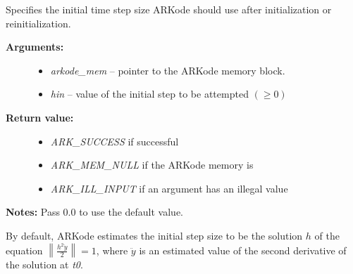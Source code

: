 \documentclass[letterpaper,10pt,english]{sphinxmanual}
\begin{document}
\begin{fulllineitems}
\label{c_interface/User_callable:c.ARKodeSetInitStep}
Specifies the initial time step size ARKode should use after
initialization or reinitialization.
\begin{description}
\item[{\textbf{Arguments:}}] \leavevmode\begin{itemize}
\item {} 
\emph{arkode\_mem} -- pointer to the ARKode memory block.

\item {} 
\emph{hin} -- value of the initial step to be attempted \((\ge 0)\)

\end{itemize}

\item[{\textbf{Return value:}}] \leavevmode\begin{itemize}
\item {} 
\emph{ARK\_SUCCESS} if successful

\item {} 
\emph{ARK\_MEM\_NULL} if the ARKode memory is 

\item {} 
\emph{ARK\_ILL\_INPUT} if an argument has an illegal value

\end{itemize}

\end{description}

\textbf{Notes:} Pass 0.0 to use the default value.

By default, ARKode estimates the initial step size to be the
solution \(h\) of the equation \(\left\| \frac{h^2
\ddot{y}}{2}\right\| = 1\), where \(\ddot{y}\) is an estimated
value of the second derivative of the solution at \emph{t0}.

\end{fulllineitems}

\end{document}
